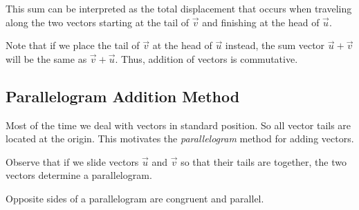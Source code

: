 \documentclass{ximera}
\begin{document}
This sum can be interpreted as the total displacement that occurs when traveling along the two vectors starting at the tail of $\vec{v}$ and finishing at the head of $\vec{u}$.

Note that if we place the tail of $\vec{v}$ at the head of $\vec{u}$ instead, the sum vector $\vec{u}+\vec{v}$ will be the same as $\vec{v}+\vec{u}$.  Thus, addition of vectors is commutative.
\subsection*{Parallelogram Addition Method}
Most of the time we deal with vectors in standard position.  So all vector tails are located at the origin.  This motivates the {\it parallelogram} method for adding vectors.  

Observe that if we slide vectors $\vec{u}$ and $\vec{v}$ so that their tails are together, the two vectors determine a parallelogram.  

\begin{image}[2.5in]
\end{image}

Opposite sides of a parallelogram are congruent and parallel.

\begin{image}[2.5in]
\end{image}
\end{document}
